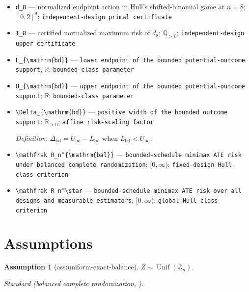 \documentclass{article}
\newtheorem{assumption}{Assumption}
\begin{document}
\begin{itemize}
  \item \texttt{d\_\allowbreak{}8} --- normalized endpoint action in Hull's shifted-binomial game at \(n=8\); \([0,2]^9\); \texttt{independent-\allowbreak{}design primal certificate}
  \item \texttt{I\_\allowbreak{}8} --- certified normalized maximum risk of \(d_8\); \(\mathbb Q_{>0}\); \texttt{independent-\allowbreak{}design upper certificate}
  \item \texttt{L\_\allowbreak{}\{\textbackslash{}\allowbreak{}mathrm\{bd\}\allowbreak{}\}\allowbreak{}} --- \texttt{lower endpoint of the bounded potential-\allowbreak{}outcome support}; \(\mathbb R\); \texttt{bounded-\allowbreak{}class parameter}
  \item \texttt{U\_\allowbreak{}\{\textbackslash{}\allowbreak{}mathrm\{bd\}\allowbreak{}\}\allowbreak{}} --- \texttt{upper endpoint of the bounded potential-\allowbreak{}outcome support}; \(\mathbb R\); \texttt{bounded-\allowbreak{}class parameter}
  \item \texttt{\textbackslash{}\allowbreak{}Delta\_\allowbreak{}\{\textbackslash{}\allowbreak{}mathrm\{bd\}\allowbreak{}\}\allowbreak{}} --- \texttt{positive width of the bounded outcome support}; \(\mathbb R_{>0}\); \texttt{affine risk-\allowbreak{}scaling factor}
  \par\smallskip\noindent\emph{Definition.} \(\Delta_{\mathrm{bd}}=U_{\mathrm{bd}}-L_{\mathrm{bd}}\) when \(L_{\mathrm{bd}}<U_{\mathrm{bd}}\).
  \item \texttt{\textbackslash{}\allowbreak{}mathfrak R\_\allowbreak{}n\textasciicircum{}\{\textbackslash{}\allowbreak{}mathrm\{bal\}\allowbreak{}\}\allowbreak{}} --- \texttt{bounded-\allowbreak{}schedule minimax ATE risk under balanced complete randomization}; \([0,\infty)\); \texttt{fixed-\allowbreak{}design Hull-\allowbreak{}class criterion}
  \item \texttt{\textbackslash{}\allowbreak{}mathfrak R\_\allowbreak{}n\textasciicircum{}\textbackslash{}\allowbreak{}star} --- \texttt{bounded-\allowbreak{}schedule minimax ATE risk over all designs and measurable estimators}; \([0,\infty)\); \texttt{global Hull-\allowbreak{}class criterion}
\end{itemize}

\section{Assumptions}

\begin{assumption}[ass:uniform-exact-balance]\label{ass:uniform-exact-balance}
\(Z\sim\operatorname{Unif}(\mathcal Z_n)\).
\par\smallskip\noindent\emph{Standard} (balanced complete randomization, \cite{DingDasgupta2016}).
\end{assumption}
\end{document}
